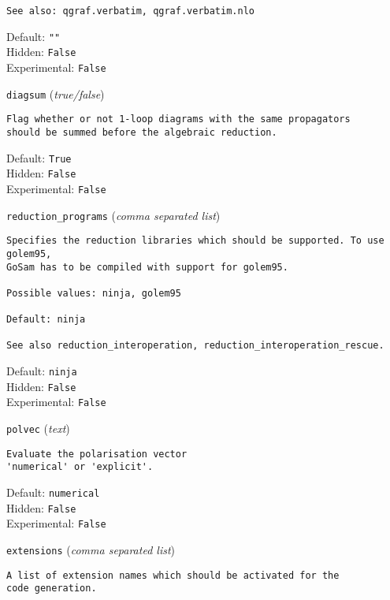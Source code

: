 \begin{basedescript}{\desclabelstyle{\pushlabel}}
\begin{verbatim}
See also: qgraf.verbatim, qgraf.verbatim.nlo
\end{verbatim}
Default: \verb|""|
\\Hidden: \verb|False|
\\Experimental: \verb|False|
\\\item[\colorbox{gray!30}{\texttt{diagsum}}] (\textit{true/false})
\begin{verbatim}
Flag whether or not 1-loop diagrams with the same propagators
should be summed before the algebraic reduction.
\end{verbatim}
Default: \verb|True|
\\Hidden: \verb|False|
\\Experimental: \verb|False|
\\\item[\colorbox{gray!30}{\texttt{reduction\_programs}}] (\textit{comma separated list})
\begin{verbatim}
Specifies the reduction libraries which should be supported. To use golem95,
GoSam has to be compiled with support for golem95.

Possible values: ninja, golem95

Default: ninja

See also reduction_interoperation, reduction_interoperation_rescue.
\end{verbatim}
Default: \verb|ninja|
\\Hidden: \verb|False|
\\Experimental: \verb|False|
\\\item[\colorbox{gray!30}{\texttt{polvec}}] (\textit{text})
\begin{verbatim}
Evaluate the polarisation vector
'numerical' or 'explicit'.
\end{verbatim}
Default: \verb|numerical|
\\Hidden: \verb|False|
\\Experimental: \verb|False|
\\\item[\colorbox{gray!30}{\texttt{extensions}}] (\textit{comma separated list})
\begin{verbatim}
A list of extension names which should be activated for the
code generation.


\end{verbatim}
\end{basedescript}
